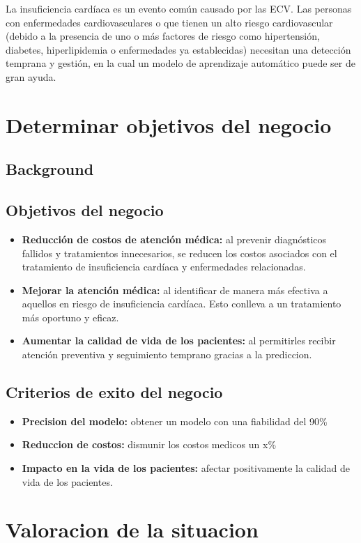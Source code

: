 \documentclass[12pt, letterpaper, spanish]{article}
\begin{document}
La insuficiencia cardíaca es un evento común causado por las ECV.
Las personas con enfermedades cardiovasculares o que tienen un alto riesgo cardiovascular 
(debido a la presencia de uno o más factores de riesgo como hipertensión, diabetes, 
hiperlipidemia o enfermedades ya establecidas) necesitan una detección temprana y gestión, 
en la cual un modelo de aprendizaje automático puede ser de gran ayuda.
\section{Determinar objetivos del negocio}
\subsection{Background}

\subsection{Objetivos del negocio}
  \begin{itemize}
    \item{\textbf{Reducción de costos de atención médica: }
    al prevenir diagnósticos fallidos y tratamientos innecesarios, se reducen los costos
    asociados con el tratamiento de insuficiencia cardíaca y enfermedades relacionadas.}
    \item{\textbf{Mejorar la atención médica:} 
    al identificar de manera más efectiva a aquellos en riesgo de insuficiencia cardíaca. 
    Esto conlleva a un tratamiento más oportuno y eficaz.}
    \item{\textbf{Aumentar la calidad de vida de los pacientes:} 
    al permitirles recibir atención preventiva y seguimiento temprano gracias a la prediccion.}
  \end{itemize}
\subsection{Criterios de exito del negocio}
  \begin{itemize}
    \item{\textbf{Precision del modelo: }obtener un modelo con una fiabilidad del 90\%} 
    \item{\textbf{Reduccion de costos: }dismunir los costos medicos un x\%}
    \item{\textbf{Impacto en la vida de los pacientes: }afectar positivamente la calidad de vida
    de los pacientes.}
  \end{itemize}
\section{Valoracion de la situacion}
\end{document}

